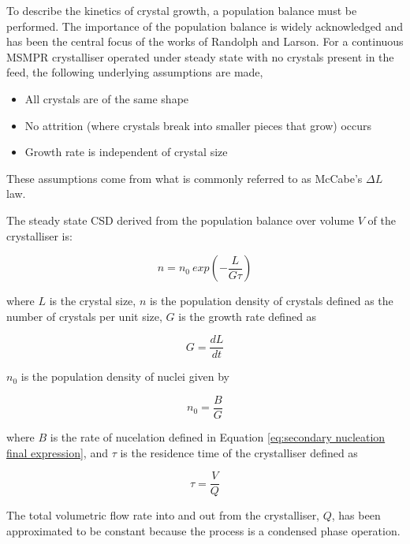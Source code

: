 To describe the kinetics of crystal growth, a population balance must be performed. The importance of the population balance is widely acknowledged and has been the central focus of the works of Randolph and Larson. \cite{richardson_chemical_nodate} \cite{randolph_theory_1971} For a continuous MSMPR crystalliser operated under steady state with no crystals present in the feed, the following underlying assumptions are made,

\begin{itemize}
    \item All crystals are of the same shape
    \item No attrition (where crystals break into smaller pieces that grow) occurs
    \item Growth rate is independent of crystal size
\end{itemize}

\noindent These assumptions come from what is commonly referred to as McCabe's $\Delta L$ law. 

The steady state CSD derived from the population balance over volume $V$ of the crystalliser is:

\begin{equation}
    n = n_0 ~exp(-\frac{L}{G\tau})
\end{equation}

\noindent where $L$ is the crystal size, $n$ is the population density of crystals defined as the number of crystals per unit size, $G$ is the growth rate defined as 

\begin{equation}
    G = \frac{dL}{dt}
\end{equation}

\noindent $n_0$ is the population density of nuclei given by 

\begin{equation}
    n_0 = \frac{B}{G}
\end{equation}

\noindent where $B$ is the rate of nucelation defined in Equation \ref{eq:secondary nucleation final expression}, and $\tau$ is the residence time of the crystalliser defined as 

\begin{equation}
    \tau = \frac{V}{Q}
\end{equation}

\noindent The total volumetric flow rate into and out from the crystalliser, $Q$, has been approximated to be constant because the process is a condensed phase operation. \cite{levenspiel_chemical_1999} 

